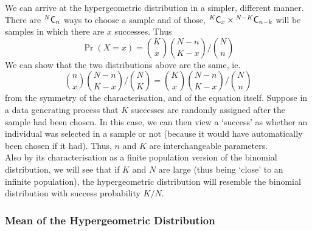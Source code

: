 \documentclass[11pt]{report} %
\begin{document}
We can arrive at the hypergeometric distribution in a simpler, different manner. There are $\mathstrut^{N}\mathsf{C}_{n}$ ways to choose a sample and of those, $\mathstrut^{K}\mathsf{C}_{x}\times\mathstrut^{N - K}\mathsf{C}_{n - k}$ will be samples in which there are $x$ successes. Thus
\begin{equation}
\operatorname{Pr}\left(X = x\right) = \binom{K}{x}\binom{N - n}{K - x}/\binom{N}{n}
\end{equation}
We can show that the two distributions above are the same, ie.
\begin{equation}
\binom{n}{x}\binom{N - n}{K - x}/\binom{N}{K} = \binom{K}{x}\binom{N - n}{K - x}/\binom{N}{n}
\end{equation}
from the symmetry of the characterisation, and of the equation itself. Suppose in a data generating process that $K$ successes are randomly assigned after the sample had been chosen. In this case, we can then view a `success' as whether an individual was selected in a sample or not (because it would have automatically been chosen if it had). Thus, $n$ and $K$ are interchangeable parameters. \\

Also by its characterisation as a finite population version of the binomial distribution, we will see that if $K$ and $N$ are large (thus being `close' to an infinite population), the hypergeometric distribution will resemble the binomial distribution with success probability $K/N$. 

\subsubsection{Mean of the Hypergeometric Distribution}
\end{document}
